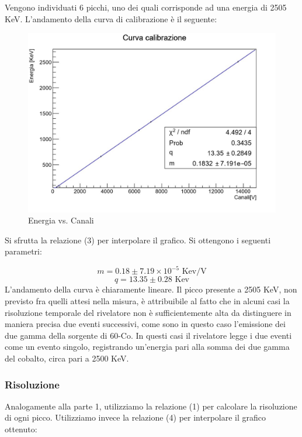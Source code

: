 \documentclass[a4paper,10pt]{article}
\newcommand*{\unit}[1]{\ensuremath{\mathrm{\,#1}}}
\begin{document}
Vengono individuati 6 picchi, uno dei quali corrisponde ad una energia di 2505 KeV. L'andamento della curva di calibrazione \`e il seguente:

\begin{figure}[H]
    \centering
    \includegraphics[scale=0.45]{grafici/rettacalibrazionemultigamma}
    \caption{Energia vs. Canali}
\end{figure}

Si sfrutta la relazione (3) per interpolare il grafico. Si ottengono i seguenti parametri:

$$
	m=0.18 \pm 7.19 \times 10^{-5}\, \unit{Kev/V}
$$
$$
	q=13.35 \pm 0.28\, \unit{Kev}
$$
L'andamento della curva \`e chiaramente lineare. Il picco presente a 2505 KeV, non previsto fra quelli attesi nella misura, \`e attribuibile al fatto che in alcuni casi la risoluzione temporale del rivelatore non \`e sufficientemente alta da distinguere in maniera precisa due eventi successivi, come sono in questo caso l'emissione dei due gamma della sorgente di 60-Co. In questi casi il rivelatore legge i due eventi come un evento singolo, registrando un'energia pari alla somma dei due gamma del cobalto, circa pari a 2500 KeV.


\subsubsection{Risoluzione}
Analogamente alla parte 1, utilizziamo la relazione (1) per calcolare la risoluzione di ogni picco. Utilizziamo invece la relazione (4) per interpolare il grafico ottenuto:
\end{document}
